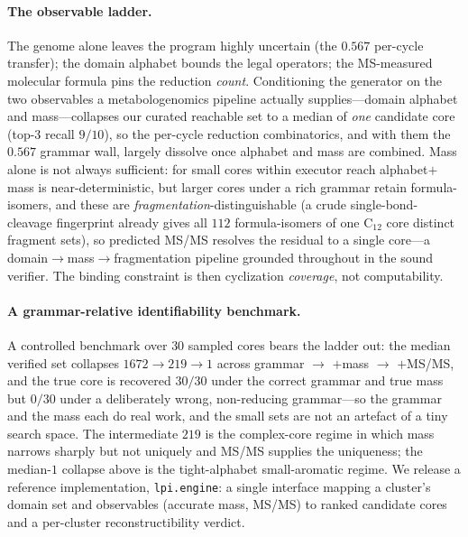 \documentclass[11pt]{article}
\theoremstyle{definition}
\newcommand{\code}[1]{\texttt{#1}}
\begin{document}
\paragraph{The observable ladder.} The genome alone leaves the program highly uncertain (the $0.567$
per-cycle transfer); the domain alphabet bounds the legal operators; the MS-measured molecular
formula pins the reduction \emph{count}. Conditioning the generator on the two observables a
metabologenomics pipeline actually supplies---domain alphabet and mass---collapses our curated
reachable set to a median of \emph{one} candidate core (top-3 recall $9/10$), so the per-cycle
reduction combinatorics, and with them the $0.567$ grammar wall, largely dissolve once alphabet and
mass are combined. Mass alone is not always sufficient: for small cores within executor reach
alphabet$+$mass is near-deterministic, but larger cores under a rich grammar retain formula-isomers,
and these are \emph{fragmentation}-distinguishable (a crude single-bond-cleavage fingerprint already
gives all $112$ formula-isomers of one $\mathrm{C_{12}}$ core distinct fragment sets), so predicted
MS/MS resolves the residual to a single core---a domain$\to$mass$\to$fragmentation pipeline grounded
throughout in the sound verifier. The binding constraint is then cyclization \emph{coverage}, not
computability.

\paragraph{A grammar-relative identifiability benchmark.} A controlled benchmark over $30$ sampled
cores bears the ladder out: the median verified set collapses $1672\!\to\!219\!\to\!1$ across
grammar $\to$ $+$mass $\to$ $+$MS/MS, and the true core is recovered $30/30$ under the correct
grammar and true mass but $0/30$ under a deliberately wrong, non-reducing grammar---so the grammar
and the mass each do real work, and the small sets are not an artefact of a tiny search space. The
intermediate $219$ is the complex-core regime in which mass narrows sharply but not uniquely and
MS/MS supplies the uniqueness; the median-$1$ collapse above is the tight-alphabet small-aromatic
regime. We release a reference implementation, \code{lpi.engine}: a single interface mapping a
cluster's domain set and observables (accurate mass, MS/MS) to ranked candidate cores and a
per-cluster reconstructibility verdict.
\end{document}
